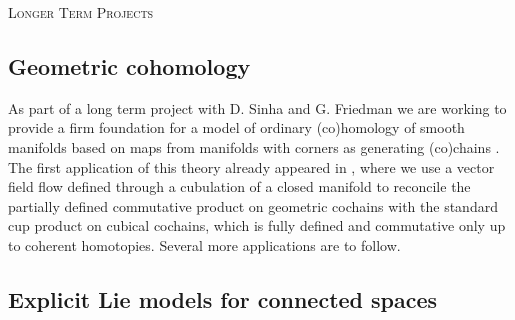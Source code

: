 \vspace*{6pt} \noindent \textsc{Longer Term Projects}

\subsection{Geometric cohomology} \label{ss:geometric cohomology}

As part of a long term project with D. Sinha and G. Friedman we are working to provide a firm foundation for a model of ordinary (co)homology of smooth manifolds based on maps from manifolds with corners as generating (co)chains \cite{medina2021foundations}.
The first application of this theory already appeared in \cite{medina2021flowing}, where we use a vector field flow defined through a cubulation of a closed manifold to reconcile the partially defined commutative product on geometric cochains with the standard cup product on cubical cochains, which is fully defined and commutative only up to coherent homotopies.
Several more applications are to follow.

\subsection{Explicit Lie models for connected spaces} \label{ss:lie models}

